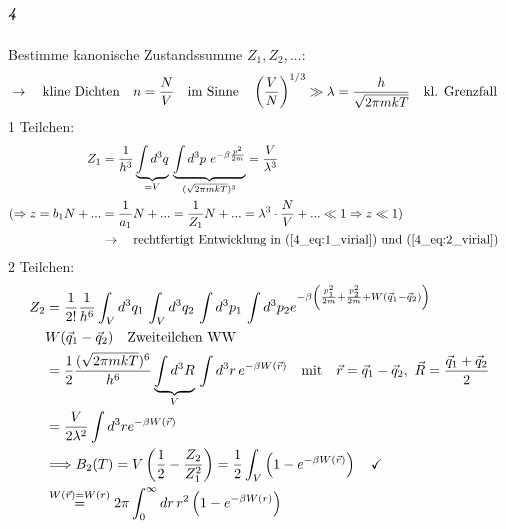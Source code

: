 \subparagraph{4} Bestimme kanonische Zustandssumme $Z_1,Z_2,...$:
\begin{align}
    &\rightarrow \qq{kline Dichten} n = \frac{N}{V} \qq{im Sinne} \left(\frac{V}{N}\right)^{1/3} \gg \lambda = \frac{h}{\sqrt{2\pi mkT}} \qq{kl. Grenzfall}\\
\end{align}
1 Teilchen:
\begin{align}
    Z_1 &= \frac{1}{h^3} \underbrace{\int d^3q}_{=V} \, \underbrace{\int d^3p \ e^{-\beta \frac{p^2}{2m}} }_{(\sqrt{2\pi mkT})^3} = \frac{V}{\lambda^3} \\
    (\Rightarrow z=b_1N+...&=\frac{1}{a_1}N+...=\frac{1}{Z_1}N+...= \lambda^3 \cdot \frac{N}{V} + ... \ll 1 \Rightarrow z \ll 1 )\\
    &\rightarrow \qq{rechtfertigt Entwicklung in (\ref{4_eq:1_virial}) und (\ref{4_eq:2_virial})}
\end{align}
2 Teilchen:
\begin{align}
    Z_2 &= \frac{1}{2!} \frac{1}{h^6} \int_V d^3q_1 \, \int_V d^3q_2 \, \int d^3p_1 \, \int d^3p_2 e^{-\beta \left(\frac{p_1^2}{2m}+\frac{p_2^2}{2m}+W(\Vec{q}_1 - \Vec{q}_2)\right)} \\
    &W(\Vec{q}_1 - \Vec{q}_2) \qq{Zweiteilchen WW}\\
    &= \frac{1}{2} \frac{(\sqrt{2\pi mkT})^6}{h^6} \underbrace{\int d^3R}_{V} \, \int d^3r \, e^{-\beta W(\Vec{r})} \qq{mit} \Vec{r} = \Vec{q}_1 - \Vec{q}_2, \ \Vec{R} = \frac{\Vec{q}_1 + \Vec{q}_2}{2} \\
    &= \frac{V}{2\lambda^2} \int d^3r e^{-\beta W(\Vec{r})}\\
    &\Longrightarrow B_2(T) = V\left(\frac{1}{2}-\frac{Z_2}{Z_1^2}\right) = \frac{1}{2} \int_V \left(1-e^{-\beta W(\Vec{r})}\right) \quad \checkmark\\
    &\stackrel{W(\Vec{r})=W(r)}{=} 2\pi \int_0^{\infty} dr \, r^2\left(1-e^{-\beta W(r)}\right)
\end{align}

